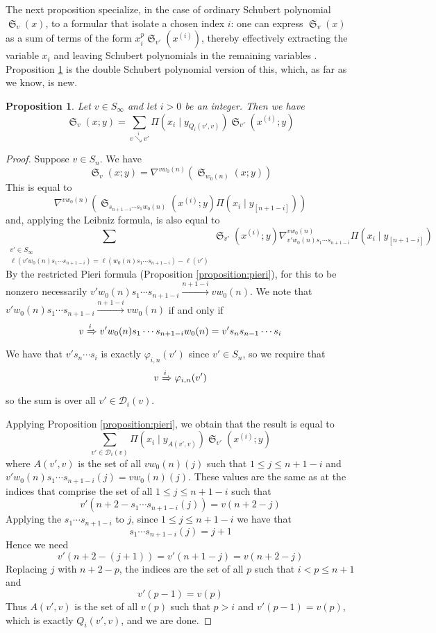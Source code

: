 \documentclass[reqno]{amsart}
\newtheorem{proposition}[lemma]{Proposition}
\theoremstyle{definition}
\theoremstyle{remark}
\numberwithin{equation}{subsection}
\DeclareMathOperator{\sch}{\mathfrak{S}}
\newcommand{\tom}[1]{\xrightarrow{#1}}
\newcommand{\Tom}[1]{\xRightarrow{#1}}
\newcommand{\smpfu}{\mathsf{\Pi}}
\newcommand{\smpr}[3]{\ensuremath{}\smpfu\left( #1 \mid #2_{[#3]}\right)}
\newcommand{\smpre}[2]{\ensuremath{}\smpfu\left( #1 \mid #2\right)}
\newcommand{\downvar}[1]{\stackrel{#1}{\searrow}}
\begin{document}
The next proposition specialize, in the case of ordinary Schubert polynomial $\sch_v(x)$, to a formular that isolate a chosen index $i$: one can express $\sch_v(x)$ as a sum of terms of the form $x_i^p\sch_{v'}(x^{(i)})$, thereby effectively extracting the variable $x_i$ and leaving Schubert polynomials in the remaining variables \cite[Theorem~5.1]{bsskew}. Proposition \ref{proposition:pullindex} is the double Schubert polynomial version of this, which, as far as we know, is new.%


\begin{proposition} \label{proposition:pullindex}
Let $v\in S_\infty$ and let $i>0$ be an integer. Then we have
$$\sch_v(x;y)=\sum_{v\downvar{i} v'}\smpre{x_i}{y_{Q_i(v',v)}}\sch_{v'}(x^{(i)};y)$$
\end{proposition}
\begin{proof}
Suppose $v\in S_n$. We have
$$\sch_v(x;y)=\nabla^{vw_0(n)}(\sch_{w_0(n)}(x;y))$$
This is equal to
$$\nabla^{vw_0(n)}(\sch_{s_{n+1-i}\cdots s_1w_0(n)}(x^{(i)};y)\smpr{x_i}{y}{n+1-i})$$
and, applying the Leibniz formula, is also equal to
$$\sum_{\substack{v'\in S_\infty\\\ell(v'w_0(n)s_1\cdots s_{n+1-i})=\ell(w_0(n)s_1\cdots s_{n+1-i})-\ell(v')}}\sch_{v'}(x^{(i)};y)\nabla_{v'w_0(n)s_1\cdots s_{n+1-i}}^{vw_0(n)}\smpr{x_i}{y}{n+1-i}$$
By the restricted Pieri formula (Proposition \ref{proposition:pieri}), for this to be nonzero necessarily $v'w_0(n)s_1\cdots s_{n+1-i}\tom{n+1-i}vw_0(n)$. We note that $v'w_0(n)s_1\cdots s_{n+1-i}\tom{n+1-i}vw_0(n)$ if and only if 
$$v\Tom{i}v'w_0(n)s_1\cdots s_{n+1-i}w_0(n)=v's_ns_{n-1}\cdots s_i$$
We have that $v's_n\cdots s_i$ is exactly $\varphi_{i,n}(v')$ since $v'\in S_n$, so we require that
$$v\Tom{i}\varphi_{i,n}(v')$$
so the sum is over all $v'\in \mathcal{D}_i(v)$.

Applying Proposition \ref{proposition:pieri}, we obtain that the result is equal to
$$\sum_{v'\in \mathcal{D}_i(v)} \smpre{x_i}{y_{A(v',v)}}\sch_{v'}(x^{(i)};y)$$
where $A(v',v)$ is the set of all $vw_0(n)(j)$ such that $1\leq j\leq n+1-i$ and $v'w_0(n)s_1\cdots s_{n+1-i}(j)=vw_0(n)(j)$. These values are the same as at the indices that comprise the set of all $1\leq j\leq n+1-i$ such that
$$v'(n+2-s_1\cdots s_{n+1-i}(j))=v(n+2-j)$$
Applying the $s_1\cdots s_{n+1-i}$ to $j$, since $1\leq j\leq n+1-i$ we have that 
$$s_1\cdots s_{n+1-i}(j)=j+1$$
Hence we need
$$v'(n+2-(j+1))=v'(n+1-j)=v(n+2-j)$$
Replacing $j$ with $n+2-p$, the indices are the set of all $p$ such that $i<p\leq n+1$ and
$$v'(p-1)=v(p)$$
Thus $A(v',v)$ is the set of all $v(p)$ such that $p>i$ and $v'(p-1)=v(p)$, which is exactly $Q_i(v',v)$, and we are done.
\end{proof}
\end{document}
